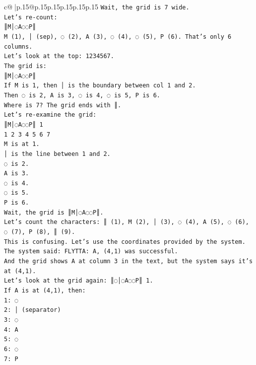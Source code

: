 \documentclass{article}
\begin{document}
{\begin{supertabular}{c@{$\;$}|p{.15\linewidth}@{}p{.15\linewidth}p{.15\linewidth}p{.15\linewidth}p{.15\linewidth}p{.15\linewidth}}
{{{\texttt{Wait, the grid is 7 wide.} \\
\texttt{Let's re{-}count:} \\
\texttt{║M│◌A◌◌P║} \\
\texttt{M (1), │ (sep), ◌ (2), A (3), ◌ (4), ◌ (5), P (6). That's only 6 columns.} \\
\texttt{Let's look at the top: 1234567.} \\
\texttt{The grid is:} \\
\texttt{║M│◌A◌◌P║} \\
\texttt{If M is 1, then │ is the boundary between col 1 and 2.} \\
\texttt{Then ◌ is 2, A is 3, ◌ is 4, ◌ is 5, P is 6.} \\
\texttt{Where is 7? The grid ends with ║.} \\
\texttt{Let's re{-}examine the grid:} \\
\texttt{║M│◌A◌◌P║ 1} \\
\texttt{1 2 3 4 5 6 7} \\
\texttt{M is at 1.} \\
\texttt{│ is the line between 1 and 2.} \\
\texttt{◌ is 2.} \\
\texttt{A is 3.} \\
\texttt{◌ is 4.} \\
\texttt{◌ is 5.} \\
\texttt{P is 6.} \\
\texttt{Wait, the grid is ║M│◌A◌◌P║.} \\
\texttt{Let's count the characters: ║ (1), M (2), │ (3), ◌ (4), A (5), ◌ (6), ◌ (7), P (8), ║ (9).} \\
\texttt{This is confusing. Let's use the coordinates provided by the system.} \\
\texttt{The system said: FLYTTA: A, (4,1) was successful.} \\
\texttt{And the grid shows A at column 3 in the text, but the system says it's at (4,1).} \\
\texttt{Let's look at the grid again: ║◌│◌A◌◌P║ 1.} \\
\texttt{If A is at (4,1), then:} \\
\texttt{1: ◌} \\
\texttt{2: │ (separator)} \\
\texttt{3: ◌} \\
\texttt{4: A} \\
\texttt{5: ◌} \\
\texttt{6: ◌} \\
\texttt{7: P} \\
}}}
\end{supertabular}}
\end{document}
